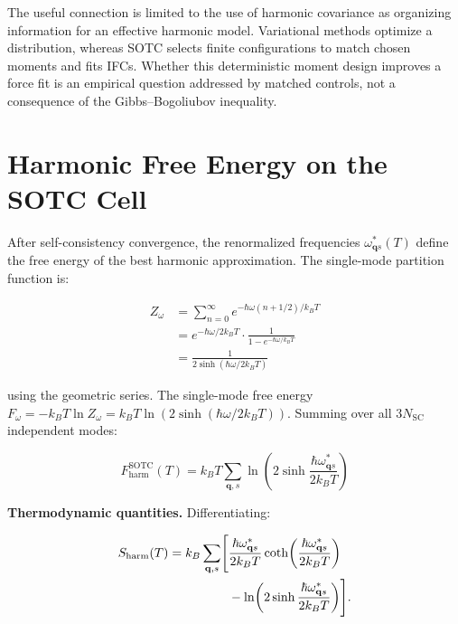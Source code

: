 \documentclass[aps,prb,reprint,amsmath,amssymb,floatfix]{revtex4-2}
\begin{document}
\color{revisionblue}
The useful connection is limited to the use of harmonic covariance as
organizing information for an effective harmonic model. Variational methods
optimize a distribution, whereas SOTC selects finite configurations to match
chosen moments and fits IFCs. Whether this deterministic moment design improves
a force fit is an empirical question addressed by matched controls, not a
consequence of the Gibbs--Bogoliubov inequality.
\color{black}

\section{Harmonic Free Energy on the SOTC
Cell}\label{appendix-h-harmonic-free-energy-on-the-sotc-cell}

After self-consistency convergence, the renormalized frequencies
\(\omega_{\mathbf{q}s}^*(T)\) define the free energy of the best
harmonic approximation. The single-mode partition function is:

\begin{align*}
Z_\omega
  &= \sum_{n=0}^\infty e^{-\hbar\omega(n+1/2)/k_BT} \\
  &= e^{-\hbar\omega/2k_BT}\cdot\frac{1}{1-e^{-\hbar\omega/k_BT}} \\
  &= \frac{1}{2\sinh(\hbar\omega/2k_BT)}
\end{align*}

using the geometric series. The single-mode free energy
\(F_\omega = -k_BT\ln Z_\omega = k_BT\ln(2\sinh(\hbar\omega/2k_BT))\).
Summing over all \(3N_\text{SC}\) independent modes:

\begin{equation*}
\boxed{F_\text{harm}^\text{SOTC}(T) = k_BT\sum_{\mathbf{q},s}\ln\!\left(2\sinh\frac{\hbar\omega_{\mathbf{q}s}^*}{2k_BT}\right)}
\end{equation*}

\textbf{Thermodynamic quantities.} Differentiating:

\color{revisionblue}
\begin{equation*}
\begin{aligned}
S_{\rm harm}(T)=k_B\sum_{\mathbf q,s}\Biggl[
 &\frac{\hbar\omega_{\mathbf q s}^*}{2k_BT}
 \coth\!\left(\frac{\hbar\omega_{\mathbf q s}^*}{2k_BT}\right)\\
 &-\ln\!\left(2\sinh\frac{\hbar\omega_{\mathbf q s}^*}{2k_BT}\right)
 \Biggr].
\end{aligned}
\end{equation*}
\color{black}
\end{document}
